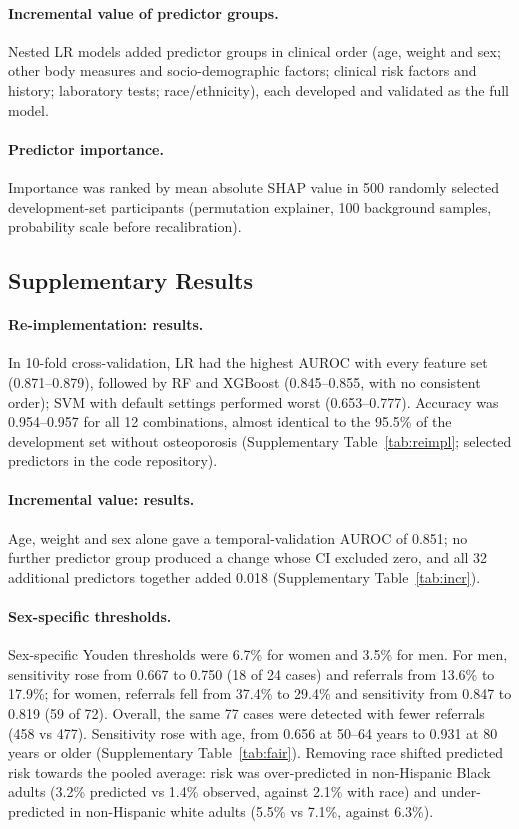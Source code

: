 \documentclass[11pt,a4paper]{article}
\begin{document}
\paragraph{Incremental value of predictor groups.} Nested LR models added predictor groups in clinical order (age, weight and sex; other body measures and socio-demographic factors; clinical risk factors and history; laboratory tests; race/ethnicity), each developed and validated as the full model.

\paragraph{Predictor importance.} Importance was ranked by mean absolute SHAP value \cite{lundberg2017} in 500 randomly selected development-set participants (permutation explainer, 100 background samples, probability scale before recalibration).

\subsection*{Supplementary Results}

\paragraph{Re-implementation: results.} In 10-fold cross-validation, LR had the highest AUROC with every feature set (0.871--0.879), followed by RF and XGBoost (0.845--0.855, with no consistent order); SVM with default settings performed worst (0.653--0.777). Accuracy was 0.954--0.957 for all 12 combinations, almost identical to the 95.5\% of the development set without osteoporosis (Supplementary Table~\ref{tab:reimpl}; selected predictors in the code repository).

\paragraph{Incremental value: results.} Age, weight and sex alone gave a temporal-validation AUROC of 0.851; no further predictor group produced a change whose CI excluded zero, and all 32 additional predictors together added 0.018 (Supplementary Table~\ref{tab:incr}).

\paragraph{Sex-specific thresholds.} Sex-specific Youden thresholds were 6.7\% for women and 3.5\% for men. For men, sensitivity rose from 0.667 to 0.750 (18 of 24 cases) and referrals from 13.6\% to 17.9\%; for women, referrals fell from 37.4\% to 29.4\% and sensitivity from 0.847 to 0.819 (59 of 72). Overall, the same 77 cases were detected with fewer referrals (458 vs 477). Sensitivity rose with age, from 0.656 at 50--64 years to 0.931 at 80 years or older (Supplementary Table~\ref{tab:fair}). Removing race shifted predicted risk towards the pooled average: risk was over-predicted in non-Hispanic Black adults (3.2\% predicted vs 1.4\% observed, against 2.1\% with race) and under-predicted in non-Hispanic white adults (5.5\% vs 7.1\%, against 6.3\%).
\end{document}
